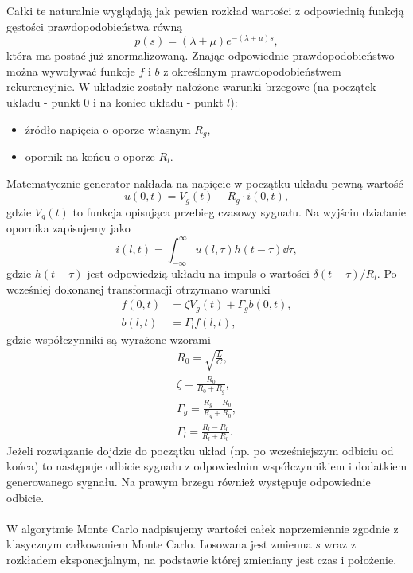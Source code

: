 \documentclass[a4paper, 12pt]{article}
\begin{document}
	Całki te naturalnie wyglądają jak pewien rozkład wartości z odpowiednią funkcją gęstości prawdopodobieństwa równą
	\begin{equation}
		p(s) = (\lambda + \mu)e^{-(\lambda+\mu)s},
	\end{equation}	
	która ma postać już znormalizowaną.
	Znając odpowiednie prawdopodobieństwo można wywoływać funkcje $f$ i $b$ z określonym prawdopodobieństwem rekurencyjnie.
	W układzie zostały nałożone warunki brzegowe (na początek układu - punkt $0$ i na koniec układu - punkt $l$):
	\begin{itemize}
		\item źródło napięcia o oporze własnym $R_g$,
		\item opornik na końcu o oporze $R_l$.
	\end{itemize}
	Matematycznie generator nakłada na napięcie w początku układu pewną wartość
	\begin{equation}
		u(0,t) = V_g(t) - R_g \cdot i(0,t),
	\end{equation}
	gdzie $V_g(t)$ to funkcja opisująca przebieg czasowy sygnału. Na wyjściu działanie opornika zapisujemy jako
	\begin{equation}
		i(l,t) = \int_{-\infty}^{\infty} u(l,\tau) h(t-\tau) \dd \tau,	
	\end{equation}
	gdzie $h(t-\tau)$ jest odpowiedzią układu na impuls o wartości $\delta(t-\tau)/R_l$. Po wcześniej dokonanej transformacji otrzymano warunki
	\begin{align}
		f(0,t) &= \zeta V_g(t) + \Gamma_g b(0,t), \\
		b(l,t) &= \Gamma_l f(l,t),
	\end{align}
	gdzie współczynniki są wyrażone wzorami
	\begin{gather*}
		R_0 = \sqrt{\frac{L}{C}}, \\
		\zeta = \frac{R_0}{R_0 + R_g}, \\
		\Gamma_g = \frac{R_g - R_0}{R_g + R_0}, \\
		\Gamma_l = \frac{R_l - R_0}{R_l + R_0}.
	\end{gather*}
	Jeżeli rozwiązanie dojdzie do początku układ (np. po wcześniejszym odbiciu od końca) to następuje odbicie sygnału z odpowiednim współczynnikiem i dodatkiem generowanego sygnału. Na prawym brzegu również występuje odpowiednie odbicie.
	\\
	\\
	W algorytmie Monte Carlo nadpisujemy wartości całek naprzemiennie zgodnie z klasycznym całkowaniem Monte Carlo. Losowana jest zmienna $s$ wraz z rozkładem eksponecjalnym, na podstawie której zmieniany jest czas i położenie.   
	
\end{document}

